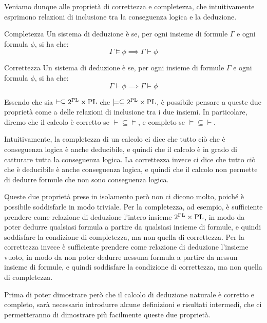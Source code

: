 Veniamo dunque alle proprietà di correttezza e completezza, che intuitivamente esprimono relazioni di inclusione tra la conseguenza logica e la deduzione. 

\begin{definition}{Completezza}
  Un sistema di deduzione è  se, per ogni insieme di formule \(\Gamma\) e ogni formula \(\phi\), si ha che:
  \[\Gamma \models \phi \implies \Gamma \vdash \phi\]
\end{definition}

\begin{definition}{Correttezza}
  Un sistema di deduzione è  se, per ogni insieme di formule \(\Gamma\) e ogni formula \(\phi\), si ha che:
  \[\Gamma \vdash \phi \implies \Gamma \models \phi\]
\end{definition}

Essendo che sia \(\vdash \subseteq 2^{\operatorname{PL}}\times\operatorname{PL}\) che \(\models \subseteq 2^{\operatorname{PL}}\times\operatorname{PL}\), è possibile pensare a queste due proprietà come a delle relazioni di inclusione tra i due insiemi. In particolare, diremo che il calcolo è corretto se \(\vdash \subseteq \models\), e completo se \(\models \subseteq \vdash\).

Intuitivamente, la completezza di un calcolo ci dice che tutto ciò che è conseguenza logica è anche deducibile, e quindi che il calcolo è in grado di catturare tutta la conseguenza logica. La correttezza invece ci dice che tutto ciò che è deducibile è anche conseguenza logica, e quindi che il calcolo non permette di dedurre formule che non sono conseguenza logica.

Queste due proprietà prese in isolamento però non ci dicono molto, poiché è possibile soddisfarle in modo triviale. Per la completezza, ad esempio, è sufficiente prendere come relazione di deduzione l'intero insieme \(2^{\operatorname{PL}}\times\operatorname{PL}\), in modo da poter dedurre qualsiasi formula a partire da qualsiasi insieme di formule, e quindi soddisfare la condizione di completezza, ma non quella di correttezza. Per la correttezza invece è sufficiente prendere come relazione di deduzione l'insieme vuoto, in modo da non poter dedurre nessuna formula a partire da nessun insieme di formule, e quindi soddisfare la condizione di correttezza, ma non quella di completezza.

Prima di poter dimostrare però che il calcolo di deduzione naturale è corretto e completo, sarà necessario introdurre alcune definizioni e risultati intermedi, che ci permetteranno di dimostrare più facilmente queste due proprietà.

